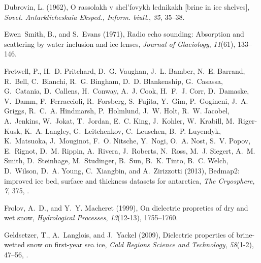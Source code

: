 \documentclass[draft,grl]{agutex}
\begin{document}
\begin{article}
\begin{thebibliography}{40}
Dubrovin, L. (1962), O rassolakh v shel'fovykh lednikakh [brine in ice
  shelves], \textit{Sovet. Antarkticheskaia Eksped., Inform. biull.},
  \textit{35}, 35--38.

Ewen~Smith, B., and S.~Evans (1971), Radio echo sounding: Absorption and
  scattering by water inclusion and ice lenses, \textit{Journal of Glaciology},
  \textit{11}(61), 133--146.

Fretwell, P., H.~D. Pritchard, D.~G. Vaughan, J.~L. Bamber, N.~E. Barrand,
  R.~Bell, C.~Bianchi, R.~G. Bingham, D.~D. Blankenship, G.~Casassa,
  G.~Catania, D.~Callens, H.~Conway, A.~J. Cook, H.~F.~J. Corr, D.~Damaske,
  V.~Damm, F.~Ferraccioli, R.~Forsberg, S.~Fujita, Y.~Gim, P.~Gogineni, J.~A.
  Griggs, R.~C.~A. Hindmarsh, P.~Holmlund, J.~W. Holt, R.~W. Jacobel,
  A.~Jenkins, W.~Jokat, T.~Jordan, E.~C. King, J.~Kohler, W.~Krabill,
  M.~Riger-Kusk, K.~A. Langley, G.~Leitchenkov, C.~Leuschen, B.~P. Luyendyk,
  K.~Matsuoka, J.~Mouginot, F.~O. Nitsche, Y.~Nogi, O.~A. Nost, S.~V. Popov,
  E.~Rignot, D.~M. Rippin, A.~Rivera, J.~Roberts, N.~Ross, M.~J. Siegert, A.~M.
  Smith, D.~Steinhage, M.~Studinger, B.~Sun, B.~K. Tinto, B.~C. Welch,
  D.~Wilson, D.~A. Young, C.~Xiangbin, and A.~Zirizzotti (2013), Bedmap2:
  improved ice bed, surface and thickness datasets for antarctica, \textit{The
  Cryosphere}, \textit{7}, 375, .

Frolov, A.~D., and Y.~Y. Macheret (1999), On dielectric propreties of dry and
  wet snow, \textit{Hydrological Processes}, \textit{13}(12-13), 1755–1760.

Geldsetzer, T., A.~Langlois, and J.~Yackel (2009), Dielectric properties of
  brine-wetted snow on first-year sea ice, \textit{Cold Regions Science and
  Technology}, \textit{58}(1-2), 47--56,
  .


\end{thebibliography}
\end{article}
\end{document}
